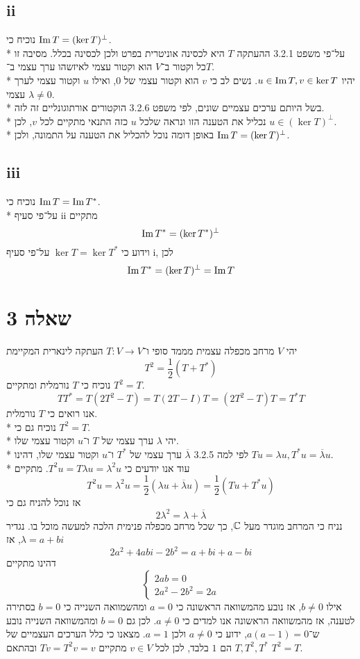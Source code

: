 \subsection{ii}
נוכיח כי $\operatorname{Im} T = (\ker T)^\perp$. \\*
על־פי משפט 3.2.1 ההעתקה $T$ היא לכסינה אוניטרית בפרט ולכן לכסינה בכלל.
מסיבה זו כל וקטור ב־$V$ הוא וקטור עצמי לאיזשהו ערך עצמי ב־$T$. \\*
יהיו $u \in \operatorname{Im} T, v \in \ker T$. נשים לב כי $v$ הוא וקטור עצמי של $0$, ואילו $u$ וקטור עצמי לערך עצמי $\lambda \ne 0$. \\*
בשל היותם ערכים עצמיים שונים, לפי משפט 3.2.6 הוקטורים אורתוגונליים זה לזה. \\*
נכליל את הטענה הזו ונראה שלכל $u$ כזה התנאי מתקיים לכל $v$, לכן $u \in (\ker T)^\perp$. \\*
באופן דומה נוכל להכליל את הטענה על התמונה, ולכן $\operatorname{Im} T = (\ker T)^\perp$.

\subsection{iii}
נוכיח כי $\operatorname{Im} T = \operatorname{Im} T^*$. \\*
על־פי סעיף ii מתקיים
\[
	\operatorname{Im} T^* = (\ker T^*)^\perp
\]
וידוע כי $\ker T = \ker T^*$ על־פי סעיף i, לכן
\[
	\operatorname{Im} T^* = (\ker T)^\perp = \operatorname{Im} T
\]

\section{שאלה 3}
יהי $V$ מרחב מכפלה עצמית מממד סופי ו־$T: V \to V$ העתקה לינארית המקיימת
\[
	T^2 = \frac{1}{2}(T + T^*)
\]
נוכיח כי $T$ נורמלית ומתקיים $T^2 = T$.
\[
	T T^* = T (2T^2 - T) = T (2T - I) T = (2T^2 - T) T = T^* T
\]
אנו רואים כי $T$ נורמלית. \\*
נוכיח גם כי $T^2 = T$. \\*
יהי $\lambda$ ערך עצמי של $T$ ו־$u$ וקטור עצמי שלו. \\*
לפי למה 3.2.5 $\overline{\lambda}$ ערך עצמי של $T^*$ ו־$u$ וקטור עצמי שלו,
דהינו $T u = \lambda u, T^* u = \overline{\lambda} u$. \\*
עוד אנו יודעים כי $T^2 u = T \lambda u = \lambda^2 u$. מתקיים
\[
	T^2 u = \lambda^2 u = \frac{1}{2}(\lambda u + \overline{\lambda} u) = \frac{1}{2}(T u + T^* u)
\]
אז נוכל להניח גם כי
\[
	2 \lambda^2 = \lambda + \overline{\lambda}
\]
נניח כי המרחב מוגדר מעל $\mathbb{C}$, כך שכל מרחב מכפלה פנימית הלכה למעשה מוכל בו.
נגדיר $\lambda = a + bi$, אז
\[
	2a^2 + 4abi - 2b^2 = a + bi + a - bi
\]
דהינו מתקיים
\[
	\begin{cases}
		2ab = 0 \\
		2a^2 - 2b^2 = 2a
	\end{cases}
\]
אילו $b \ne 0$, אז נובע מהמשוואה הראשונה כי $a = 0$ ומהשמוואה השנייה כי $b = 0$ בסתירה לטענה, אז מהמשוואה הראשונה אנו למדים כי $a \ne 0$.
לכן גם $b = 0$ ומהמשוואה השנייה נובע ש־$a(a - 1) = 0$, ידוע כי $a \ne 0$ ולכן $a = 1$.
מצאנו כי כלל הערכים העצמיים של $T, T^2, T^*$ הם $1$ בלבד, לכן לכל $v \in V$ מתקיים $T v = T^2 v = v$ ובהתאם $T^2 = T$.

